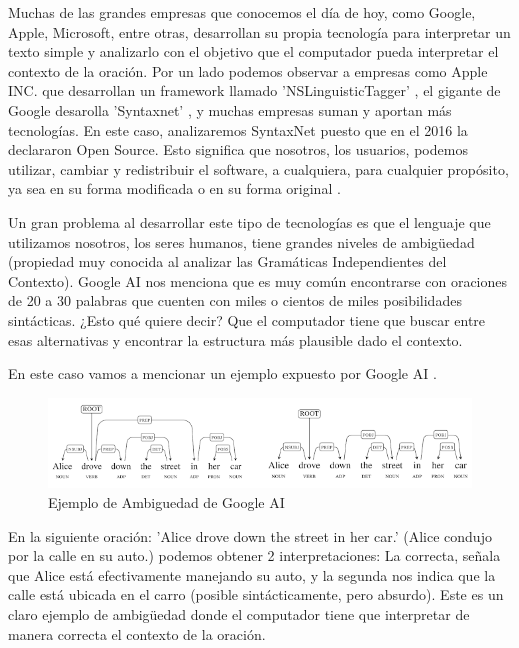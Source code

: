Muchas de las grandes empresas que conocemos el día de hoy, como Google, Apple, Microsoft, entre otras, desarrollan su propia tecnología para interpretar un texto simple y analizarlo con el objetivo que el computador pueda interpretar el contexto de la oración. Por un lado podemos observar a empresas como Apple INC. que desarrollan un framework llamado 'NSLinguisticTagger' \cite{NSLinguisticTagger}, el gigante de Google desarolla 'Syntaxnet' \cite{SyntaxnetGH}, y muchas empresas suman y aportan más tecnologías. En este caso, analizaremos SyntaxNet puesto que en el 2016 la declararon Open Source. Esto significa que nosotros, los usuarios, podemos utilizar, cambiar y redistribuir el software, a cualquiera, para cualquier propósito, ya sea en su forma modificada o en su forma original \cite{OpenSource}.

Un gran problema al desarrollar este tipo de tecnologías es que el lenguaje que utilizamos nosotros, los seres humanos, tiene grandes niveles de ambigüedad (propiedad muy conocida al analizar las Gramáticas Independientes del Contexto). Google AI \cite{GoogleAISyntaxNet} nos menciona que es muy común encontrarse con oraciones de 20 a 30 palabras que cuenten con miles o cientos de miles posibilidades sintácticas. ¿Esto qué quiere decir? Que el computador tiene que buscar entre esas alternativas y encontrar la estructura más plausible dado el contexto. 

En este caso vamos a mencionar un ejemplo expuesto por Google AI \cite{GoogleAISyntaxNet}. 

\begin{figure}[h!]
    \centering
    \includegraphics[width=\textwidth]{img/EjemploAmbiguedad.png}
    \caption{Ejemplo de Ambiguedad de Google AI \cite{GoogleAISyntaxNet}}
    \label{fig:AmbEjm}
\end{figure} 

En la siguiente oración: 'Alice drove down the street in her car.' (Alice condujo por la calle en su auto.) podemos obtener 2 interpretaciones: La correcta, señala que Alice está efectivamente manejando su auto, y la segunda nos indica que la calle está ubicada en el carro (posible sintácticamente, pero absurdo). Este es un claro ejemplo de ambigüedad donde el computador tiene que interpretar de manera correcta el contexto de la oración.


